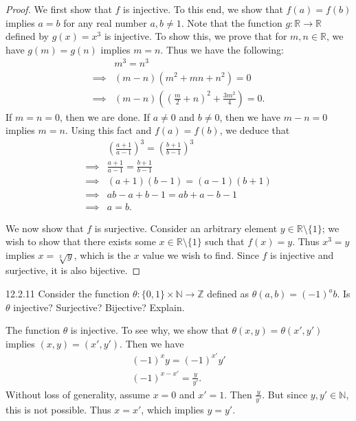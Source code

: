 \documentclass{exam}
\newcommand{\paren}[1]{\left(#1\right)}
\begin{document}
\begin{proof}
    We first show that $f$ is injective. To this end, we show that $f(a) = f(b)$ implies $a=b$ for any real number $a, b\neq1$. Note that the function $g:\mathbb R\rightarrow\mathbb R$ defined by $g(x) = x^3$ is injective. To show this, we prove that for $m,n\in\mathbb R$, we have $g(m) = g(n)$ implies $m = n$. Thus we have the following:
    \begin{align*}
        &m^3 = n^3\\
        \implies&(m-n)(m^2+mn+n^2) = 0\\
        \implies&(m-n)\paren{\paren{\frac m 2 + n}^2 + \frac{3m^2}4} = 0.
    \end{align*}
    If $m = n = 0$, then we are done. If $a\neq 0$ and $b\neq 0$, then we have $m-n = 0$ implies $m = n$. Using this fact and $f(a) = f(b)$, we deduce that
    \begin{align*}
        &\paren{\frac{a+1}{a-1}}^3 = \paren{\frac{b+1}{b-1}}^3\\
        \implies&\frac{a+1}{a-1} = \frac{b+1}{b-1}\\
        \implies&(a+1)(b-1) = (a-1)(b+1)\\
        \implies&ab-a+b-1 = ab+a-b-1\\
        \implies&a=b.
    \end{align*}

    We now show that $f$ is surjective. Consider an arbitrary element $y\in\mathbb R\setminus\{1\}$; we wish to show that there exists some $x\in\mathbb R\setminus\{1\}$ such that $f(x) = y$. Thus $x^3 = y$ implies $x=\sqrt[3]{y}$, which is the $x$ value we wish to find. Since $f$ is injective and surjective, it is also bijective.
\end{proof}

\begin{problem}{12.2.11}
    Consider the function $\theta:\{0,1\}\times\mathbb N\rightarrow\mathbb Z$ defined as $\theta(a, b)=(-1)^ab$. Is $\theta$ injective? Surjective? Bijective? Explain.
\end{problem}

The function $\theta$ is injective. To see why, we show that $\theta(x, y) = \theta(x', y')$ implies $(x, y) = (x', y')$. Then we have 
\begin{align*}
    (-1)^xy = (-1)^{x'}y'\\
    (-1)^{x-x'} = \frac{y}{y'}.
\end{align*}
Without loss of generality, assume $x = 0$ and $x' = 1$. Then $\frac{y}{y'}$. But since $y,y'\in\mathbb N$, this is not possible. Thus $x = x'$, which implies $y = y'$.
\end{document}
